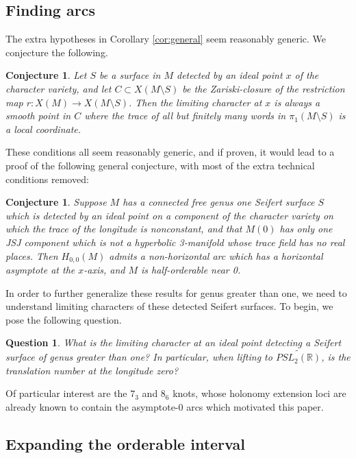 \documentclass{article}
\theoremstyle{plain}
\theoremstyle{definition}
\theoremstyle{plain}
\theoremstyle{plain}
\theoremstyle{plain}
\theoremstyle{remark}
\theoremstyle{remark}
\theoremstyle{plain}
\newtheorem{conjecture}[theorem]{Conjecture}
\theoremstyle{plain}
\newtheorem{question}[theorem]{Question}
\begin{document}
\subsection{Finding arcs}

The extra hypotheses in Corollary \ref{cor:general} seem reasonably generic. We conjecture the following.  

\begin{conjecture}
Let $S$ be a surface in $M$ detected by an ideal point $x$ of the character variety, and let $C \subset X(M \setminus S)$ be the Zariski-closure of the restriction map $r: X(M) \to X(M \setminus S)$. Then the limiting character at $x$ is always a smooth point in $C$ where the trace of all but finitely many words in $\pi_1(M \setminus S)$ is a local coordinate.
\end{conjecture}

These conditions all seem reasonably generic, and if proven, it would lead to a proof of the following general conjecture, with most of the extra technical conditions removed:

\begin{conjecture}
Suppose $M$ has a connected free genus one Seifert surface $S$ which is detected by an ideal point on a component of the character variety on which the trace of the longitude is nonconstant, and that $M(0)$ has only one JSJ component which is not a hyperbolic 3-manifold whose trace field has no real places. Then $H_{0, 0}(M)$ admits a non-horizontal arc which has a horizontal asymptote at the $x$-axis, and $M$ is half-orderable near 0.
\end{conjecture}

In order to further generalize these results for genus greater than one, we need to understand limiting characters of these detected Seifert surfaces. To begin, we pose the following question.

\begin{question}
What is the limiting character at an ideal point detecting a Seifert surface of genus greater than one? In particular, when lifting to $\widetilde{PSL_2(\mathbb{R})}$, is the translation number at the longitude zero?
\end{question}

Of particular interest are the $7_3$ and $8_6$ knots, whose holonomy extension loci are already known to contain the asymptote-0 arcs which motivated this paper. 

\subsection{Expanding the orderable interval}
\end{document}
